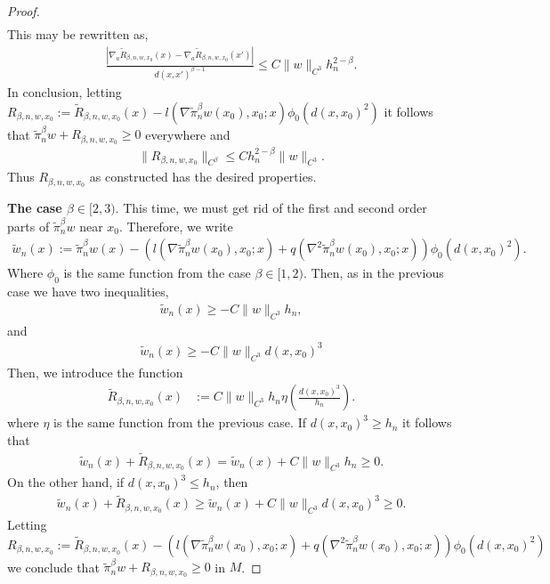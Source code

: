 \documentclass[11pt,reqno]{amsart}
\numberwithin{equation}{section}
\theoremstyle{plain}
\begin{document}
\begin{proof}
\begin{align*}
  \end{align*}
  This may be rewritten as,
  \begin{align*}
    \frac{|\nabla_a \tilde R_{\beta,n,w,x_0}(x)-\nabla_a \tilde R_{\beta,n,w,x_0}(x')|}{d(x,x')^{\beta-1}} \leq C\|w\|_{C^3}h_n^{2-\beta}.
  \end{align*}
  In conclusion, letting $R_{\beta,n,w,x_0} := \tilde R_{\beta,n,w,x_0}(x)-l(\nabla \tilde \pi_n^\beta w(x_0),x_0;x)\phi_0(d(x,x_0)^2)$ it follows that $\tilde \pi_n^\beta w + R_{\beta,n,w,x_0}\geq 0$ everywhere and
  \begin{align*}
    \|R_{\beta,n,w,x_0}\|_{C^{\beta}} \leq C h_n^{2-\beta} \|w\|_{C^3}.
  \end{align*}
  Thus $R_{\beta,n,w,x_0}$ as constructed has the desired properties.
 
  \textbf{The case $\beta \in [2,3)$}. This time, we must get rid of the first and second order parts of $\tilde \pi_n^\beta w$ near $x_0$. Therefore, we write
  \begin{align*}
    \tilde w_n(x) := \tilde \pi_n^\beta w(x)-\left ( l(\nabla \tilde \pi_n^\beta w(x_0),x_0;x)+q(\nabla^2 \tilde \pi_n^\beta w(x_0),x_0;x) \right ) \phi_{0}(d(x,x_0)^2).
  \end{align*}
  Where $\phi_{0}$ is the same function from the case $\beta \in [1,2)$. Then, as in the previous case we have two inequalities,
  \begin{align*}
    \tilde w_n(x) \geq -C\|w\|_{C^3}h_n,
  \end{align*}	  
  and
  \begin{align*}
    \tilde w_n(x) \geq -C\|w\|_{C^3}d(x,x_0)^3
  \end{align*}	  
  Then, we introduce the function
  \begin{align*}
    \tilde R_{\beta,n,w,x_0}(x) & := C\|w\|_{C^3}h_n \eta\left (\frac{d(x,x_0)^3}{h_n} \right ).
  \end{align*}
  where $\eta$ is the same function from the previous case. If $d(x,x_0)^3\geq h_n$ it follows that
  \begin{align*}
    \tilde w_n(x) + \tilde R_{\beta,n,w,x_0}(x)  = \tilde w_n(x) + C\|w\|_{C^3}h_n \geq 0.
  \end{align*}	  
  On the other hand, if $d(x,x_0)^3\leq h_n$, then
  \begin{align*}
    \tilde w_n(x) + \tilde R_{\beta,n,w,x_0}(x)  \geq \tilde w_n(x) + C\|w\|_{C^3}d(x,x_0)^3 \geq 0.
  \end{align*}	  
  Letting $R_{\beta,n,w,x_0} := \tilde R_{\beta,n,w,x_0}(x)-\left ( l(\nabla \tilde \pi_n^{\beta}w(x_0),x_0;x)+q(\nabla^2 \tilde \pi_n^{\beta}w(x_0),x_0;x)\right )\phi_0(d(x,x_0)^2)$ we conclude that $\tilde \pi_n^\beta w+R_{\beta,n,w,x_0}\geq 0$ in $M$. 
\end{proof}
\end{document}
